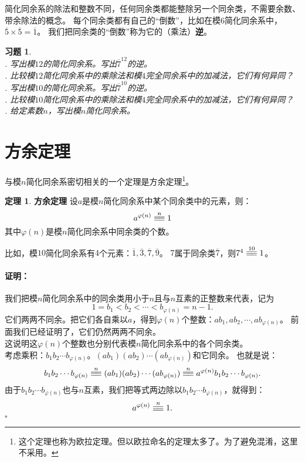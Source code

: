 \documentclass[12pt,UTF8]{ctexbook}
\theoremstyle{definition}
\newtheorem{tm}{定理}[section]
\theoremstyle{plain}
\newtheorem{xt}{习题}[section]
\renewenvironment{proof}{\paragraph{\textbf{证明：}}}{\hfill$\square$}
\newcommand{\tong}[1]{\overset{#1}{\equiv\joinrel\equiv}}
\begin{document}
简化同余系的除法和整数不同，任何同余类都能整除另一个同余类，不需要余数、带余除法的概念。
每个同余类都有自己的“倒数”，比如在模$6$简化同余系中，$\overline{5}\times\overline{5} = \overline{1}$。
我们把同余类的“倒数”称为它的（乘法）\textbf{逆}。

\begin{xt}
    \mbox{}\\
    . 写出模$12$的简化同余系。写出$\overline{7}^{12}$的逆。\\
    . 比较模$12$简化同余系中的乘除法和模$4$完全同余系中的加减法，它们有何异同？\\
    . 写出模$10$的简化同余系。写出$\overline{7}^{10}$的逆。\\
    . 比较模$10$简化同余系中的乘除法和模$4$完全同余系中的加减法，它们有何异同？\\
    . 给定素数$n$，写出模$n$简化同余系。
\end{xt}

\section{方余定理}
与模$n$简化同余系密切相关的一个定理是方余定理\footnote{这个定理也称为欧拉定理。但以欧拉命名的定理太多了。为了避免混淆，这里不采用。}。
\begin{tm}{\textbf{方余定理} }\label{tm:3-3-0}
    设$a$是模$n$简化同余系中某个同余类中的元素，则：
    $$ a^{\varphi(n)} \tong{n} 1 $$
    其中$\varphi(n)$是模$n$简化同余系中同余类的个数。
\end{tm}
比如，模$10$简化同余系有$4$个元素：$\overline{1}, \overline{3},\overline{7},\overline{9}$。
$7$属于同余类$\overline{7}$，则$7^4 \tong{10} 1$。

\begin{proof}
    我们把模$n$简化同余系中的同余类用小于$n$且与$n$互素的正整数来代表，记为
    $$1 = b_1 < b_2 < \cdots < b_{\varphi(n)} = n-1.$$
    它们两两不同余。把它们各自乘以$a$，得到$\varphi(n)$个整数：$ab_1, ab_2, \cdots , ab_{\varphi(n)}$。
    前面我们已经证明了，它们仍然两两不同余。\\
    这说明这$\varphi(n)$个整数也分别代表模$n$简化同余系中的各个同余类。\\
    考虑乘积：$b_1 b_2 \cdots b_{\varphi(n)}$。$(ab_1) (ab_2) \cdots (ab_{\varphi(n)})$和它同余。
    也就是说：
    $$b_1 b_2 \cdots b_{\varphi(n)} \tong{n} (ab_1) (ab_2) \cdots (ab_{\varphi(n)}) \tong{n} a^{\varphi(n)} b_1 b_2 \cdots b_{\varphi(n)}.$$
    由于$b_1 b_2 \cdots b_{\varphi(n)}$也与$n$互素，我们把等式两边除以$b_1 b_2 \cdots b_{\varphi(n)}$，就得到：
    $$ a^{\varphi(n)} \tong{n} 1 . $$
\end{proof}
\end{document}
